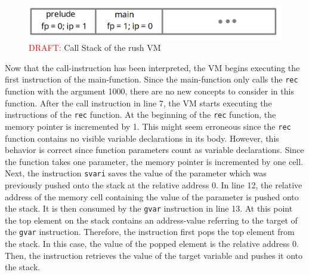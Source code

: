 \begin{figure}[h]
	\includegraphics[width=\textwidth]{./vm_call_stack_draft.png}
	\caption{\textcolor{red}{DRAFT:} Call Stack of the rush VM}
	\label{fig:rush_vm_call_stack}
\end{figure}

Now that the call-instruction has been interpreted, the VM begins executing the first instruction of the main-function.
Since the main-function only calls the \texttt{rec} function with the argument 1000, there are no new concepts to consider in this function.
After the call instruction in line 7, the VM starts executing the instructions of the \texttt{rec} function.
At the beginning of the \texttt{rec} function, the memory pointer is incremented by 1.
This might seem erroneous since the \texttt{rec} function contains no visible variable declarations in its body.
However, this behavior is correct since function parameters count as variable declarations.
Since the function takes one parameter, the memory pointer is incremented by one cell.
Next, the instruction \texttt{svari} saves the value of the parameter which was previously pushed onto the stack at the relative address 0.
In line 12, the relative address of the memory cell containing the value of the parameter is pushed onto the stack.
It is then consumed by the \texttt{gvar} instruction in line 13.
At this point the top element on the stack contains an address-value referring to the target of the \texttt{gvar} instruction.
Therefore, the instruction first pops the top element from the stack.
In this case, the value of the popped element is the relative address 0.
Then, the instruction retrieves the value of the target variable and pushes it onto the stack.

